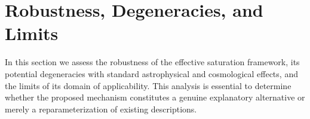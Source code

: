 \section{Robustness, Degeneracies, and Limits}
  \label{sec:robustness}

  In this section we assess the robustness of the effective saturation framework,
  its potential degeneracies with standard astrophysical and cosmological effects,
  and the limits of its domain of applicability.
  This analysis is essential to determine whether the proposed mechanism
  constitutes a genuine explanatory alternative or merely a reparameterization of existing descriptions.

  
  
  
  
  
  
  
